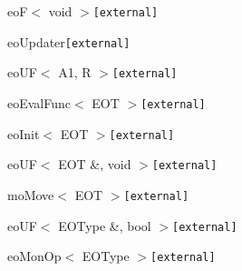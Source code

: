 \begin{CompactList}
\begin{CompactList}
\begin{CompactList}
\begin{CompactList}
\item {}
\end{CompactList}
\end{CompactList}
\item eo\-F$<$ void $>${\tt  \mbox{[}external\mbox{]}}\begin{CompactList}
\item eo\-Updater{\tt  \mbox{[}external\mbox{]}}\begin{CompactList}
\item {}
\end{CompactList}
\end{CompactList}
\item eo\-UF$<$ A1, R $>${\tt  \mbox{[}external\mbox{]}}\begin{CompactList}
\item eo\-Eval\-Func$<$ EOT $>${\tt  \mbox{[}external\mbox{]}}\begin{CompactList}
\item {}
\item {}
\end{CompactList}
\item eo\-Init$<$ EOT $>${\tt  \mbox{[}external\mbox{]}}\begin{CompactList}
\item {}
\end{CompactList}
\end{CompactList}
\item eo\-UF$<$ EOT \&, void $>${\tt  \mbox{[}external\mbox{]}}\begin{CompactList}
\item mo\-Move$<$ EOT $>${\tt  \mbox{[}external\mbox{]}}\begin{CompactList}
\item {}
\end{CompactList}
\end{CompactList}
\item eo\-UF$<$ EOType \&, bool $>${\tt  \mbox{[}external\mbox{]}}\begin{CompactList}
\item eo\-Mon\-Op$<$ EOType $>${\tt  \mbox{[}external\mbox{]}}\begin{CompactList}

\end{CompactList}
\end{CompactList}
\end{CompactList}
\end{CompactList}
